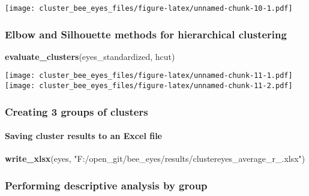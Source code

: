 \documentclass[
]{article}
\newenvironment{Shaded}{\begin{snugshade}}{\end{snugshade}}
\newcommand{\AttributeTok}[1]{\textcolor[rgb]{0.13,0.29,0.53}{#1}}
\newcommand{\DecValTok}[1]{\textcolor[rgb]{0.00,0.00,0.81}{#1}}
\newcommand{\FunctionTok}[1]{\textcolor[rgb]{0.13,0.29,0.53}{\textbf{#1}}}
\newcommand{\NormalTok}[1]{#1}
\newcommand{\OtherTok}[1]{\textcolor[rgb]{0.56,0.35,0.01}{#1}}
\newcommand{\SpecialCharTok}[1]{\textcolor[rgb]{0.81,0.36,0.00}{\textbf{#1}}}
\newcommand{\StringTok}[1]{\textcolor[rgb]{0.31,0.60,0.02}{#1}}
\begin{document}
\texttt{[image: cluster\_bee\_eyes\_files/figure-latex/unnamed-chunk-10-1.pdf]}

\subsubsection{Elbow and Silhouette methods for hierarchical
clustering}\label{elbow-and-silhouette-methods-for-hierarchical-clustering}

\begin{Shaded}
\begin{Highlighting}[]
\FunctionTok{evaluate\_clusters}\NormalTok{(eyes\_standardized, hcut)}
\end{Highlighting}
\end{Shaded}

\texttt{[image: cluster\_bee\_eyes\_files/figure-latex/unnamed-chunk-11-1.pdf]}
\texttt{[image: cluster\_bee\_eyes\_files/figure-latex/unnamed-chunk-11-2.pdf]}

\subsubsection{Creating 3 groups of
clusters}\label{creating-3-groups-of-clusters}

\begin{Shaded}
\end{Shaded}

\paragraph{Saving cluster results to an Excel
file}\label{saving-cluster-results-to-an-excel-file}

\begin{Shaded}
\begin{Highlighting}[]
\FunctionTok{write\_xlsx}\NormalTok{(eyes, }\StringTok{"F:/open\_git/bee\_eyes/results/clustereyes\_average\_r\_.xlsx"}\NormalTok{)}
\end{Highlighting}
\end{Shaded}

\subsubsection{Performing descriptive analysis by
group}\label{performing-descriptive-analysis-by-group}
\end{document}
